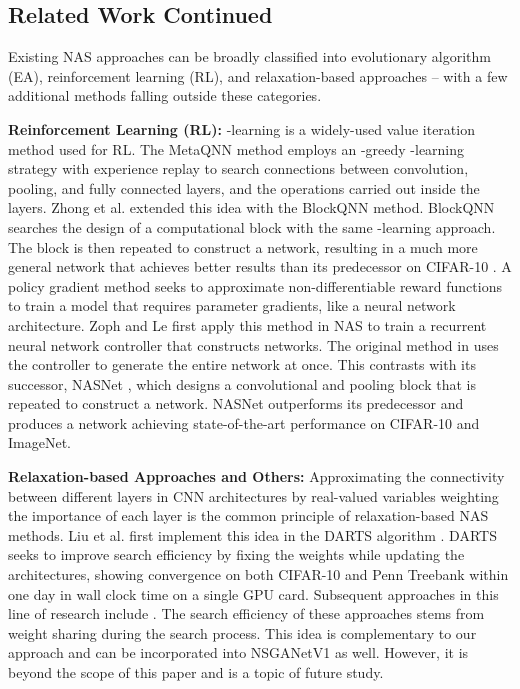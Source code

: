 \documentclass[journal]{IEEEtran}
\def\etal{{et al. }}
\def\ourmethod{NSGANetV1}
\theoremstyle{definition}
\theoremstyle{remark}
\begin{document}
\subsection{Related Work Continued\label{sec:related_work_continued}}
{
Existing NAS approaches can be broadly classified into evolutionary algorithm (EA), reinforcement learning (RL), and relaxation-based approaches -- with a few additional methods falling outside these categories.

\noindent\textbf{Reinforcement Learning (RL):} -learning \cite{watkins1989qlearning} is a widely-used value iteration method used for RL. The MetaQNN method \cite{baker2017metaqnn} employs an -greedy -learning strategy with experience replay to search connections between convolution, pooling, and fully connected layers, and the operations carried out inside the layers. Zhong \etal{}\cite{zhong2017blockqnn} extended this idea with the BlockQNN method. BlockQNN searches the design of a computational block with the same -learning approach. The block is then repeated to construct a network, resulting in a much more general network that achieves better results than its predecessor on CIFAR-10 \cite{cifar10}. A policy gradient method seeks to approximate non-differentiable reward functions to train a model that requires parameter gradients, like a neural network architecture. Zoph and Le \cite{zoph2016} first apply this method in NAS to train a recurrent neural network controller that constructs networks. The original method in \cite{zoph2016} uses the controller to generate the entire network at once. This contrasts with its successor, NASNet \cite{nasnet2018}, which designs a convolutional and pooling block that is repeated to construct a network. NASNet outperforms its predecessor and produces a network achieving state-of-the-art performance on CIFAR-10 and ImageNet. 

\vspace{3pt}
\noindent\textbf{Relaxation-based Approaches and Others:}
Approximating the connectivity between different layers in CNN architectures by real-valued variables weighting the importance of each layer is the common principle of relaxation-based NAS methods. Liu et al. first implement this idea in the DARTS algorithm \cite{liu2018darts}. DARTS seeks to improve search efficiency by fixing the weights while updating the architectures, showing convergence on both CIFAR-10 and Penn Treebank \cite{ptb} within one day in wall clock time on a single GPU card. Subsequent approaches in this line of research include \cite{Dong_2019_CVPR,xie2018snas,wu2019fbnet,liu2019auto}. The search efficiency of these approaches stems from weight sharing during the search process. This idea is complementary to our approach and can be incorporated into \ourmethod{} as well. However, it is beyond the scope of this paper and is a topic of future study.

}
\end{document}
